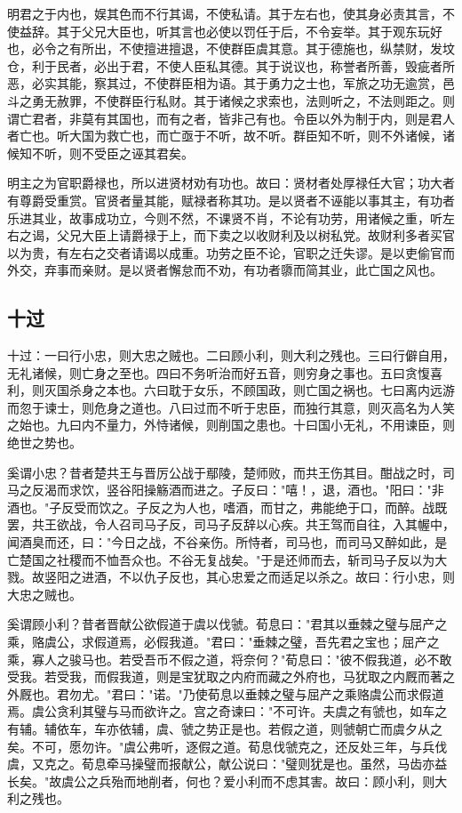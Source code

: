 \documentclass[]{article}
\begin{document}
明君之于内也，娱其色而不行其谒，不使私请。其于左右也，使其身必责其言，不使益辞。其于父兄大臣也，听其言也必使以罚任于后，不令妄举。其于观东玩好也，必令之有所出，不使擅进擅退，不使群臣虞其意。其于德施也，纵禁财，发坟仓，利于民者，必出于君，不使人臣私其德。其于说议也，称誉者所善，毁疵者所恶，必实其能，察其过，不使群臣相为语。其于勇力之士也，军旅之功无逾赏，邑斗之勇无赦罪，不使群臣行私财。其于诸候之求索也，法则听之，不法则距之。则谓亡君者，非莫有其国也，而有之者，皆非己有也。令臣以外为制于内，则是君人者亡也。听大国为救亡也，而亡亟于不听，故不听。群臣知不听，则不外诸候，诸候知不听，则不受臣之诬其君矣。

明主之为官职爵禄也，所以进贤材劝有功也。故曰：贤材者处厚禄任大官；功大者有尊爵受重赏。官贤者量其能，赋禄者称其功。是以贤者不诬能以事其主，有功者乐进其业，故事成功立，今则不然，不课贤不肖，不论有功劳，用诸候之重，听左右之谒，父兄大臣上请爵禄于上，而下卖之以收财利及以树私党。故财利多者买官以为贵，有左右之交者请谒以成重。功劳之臣不论，官职之迁失谬。是以吏偷官而外交，弃事而亲财。是以贤者懈怠而不劝，有功者隳而简其业，此亡国之风也。

\hypertarget{header-n867}{%
\subsection{十过}\label{header-n867}}

十过：一曰行小忠，则大忠之贼也。二曰顾小利，则大利之残也。三曰行僻自用，无礼诸候，则亡身之至也。四曰不务听治而好五音，则穷身之事也。五曰贪愎喜利，则灭国杀身之本也。六曰耽于女乐，不顾国政，则亡国之祸也。七曰离内远游而忽于谏士，则危身之道也。八曰过而不听于忠臣，而独行其意，则灭高名为人笑之始也。九曰内不量力，外恃诸候，则削国之患也。十曰国小无礼，不用谏臣，则绝世之势也。

奚谓小忠？昔者楚共王与晋厉公战于鄢陵，楚师败，而共王伤其目。酣战之时，司马之反渴而求饮，竖谷阳操觞酒而进之。子反曰："嘻！，退，酒也。"阳曰："非酒也。"子反受而饮之。子反之为人也，嗜酒，而甘之，弗能绝于口，而醉。战既罢，共王欲战，令人召司马子反，司马子反辞以心疾。共王驾而自往，入其幄中，闻酒臭而还，曰："今日之战，不谷亲伤。所恃者，司马也，而司马又醉如此，是亡楚国之社稷而不恤吾众也。不谷无复战矣。"于是还师而去，斩司马子反以为大戮。故竖阳之进酒，不以仇子反也，其心忠爱之而适足以杀之。故曰：行小忠，则大忠之贼也。

奚谓顾小利？昔者晋献公欲假道于虞以伐虢。荀息曰："君其以垂棘之璧与屈产之乘，赂虞公，求假道焉，必假我道。"君曰："垂棘之璧，吾先君之宝也；屈产之乘，寡人之骏马也。若受吾币不假之道，将奈何？"荀息曰："彼不假我道，必不敢受我。若受我，而假我道，则是宝犹取之内府而藏之外府也，马犹取之内厩而著之外厩也。君勿尤。"君曰："诺。"乃使荀息以垂棘之璧与屈产之乘赂虞公而求假道焉。虞公贪利其璧与马而欲许之。宫之奇谏曰："不可许。夫虞之有虢也，如车之有辅。辅依车，车亦依辅，虞、虢之势正是也。若假之道，则虢朝亡而虞夕从之矣。不可，愿勿许。"虞公弗听，逐假之道。荀息伐虢克之，还反处三年，与兵伐虞，又克之。荀息牵马操璧而报献公，献公说曰："璧则犹是也。虽然，马齿亦益长矣。"故虞公之兵殆而地削者，何也？爱小利而不虑其害。故曰：顾小利，则大利之残也。
\end{document}
